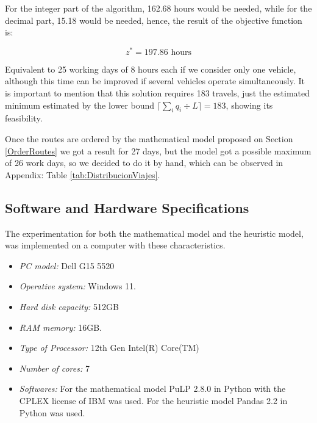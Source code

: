 \documentclass{amsart}
\begin{document}
            For the integer part of the algorithm, 162.68 hours would be needed, while for the decimal part, 15.18 would be needed, hence, the result of the objective function is:
            
            $$z^* = 197.86 \text{ hours}$$

            Equivalent to 25 working days of 8 hours each if we consider only one vehicle, although this time can be improved if several vehicles operate simultaneously. It is important to mention that this solution requires 183 travels, just the estimated minimum estimated by the lower bound $\lceil \sum_{i} q_i \div L \rceil = 183$, showing its feasibility.
            
            Once the routes are ordered by the mathematical model proposed on Section \ref{OrderRoutes} we got a result for 27 days, but the model got a possible maximum of 26 work days, so we decided to do it by hand, which can be observed in Appendix: Table \ref{tab:DistribucionViajes}.
       
            \subsection{Software and Hardware Specifications}
            
            The experimentation for both the mathematical model and the heuristic model, was implemented on a computer with these characteristics.
    
            \begin{itemize}
                \item \textit{PC model:} Dell G15 5520
                \item \textit{Operative system:} Windows 11.
                \item \textit{Hard disk capacity:} 512GB
                \item \textit{RAM memory:} 16GB.
                \item \textit{Type of Processor:} 12th Gen Intel(R) Core(TM)
                \item \textit{Number of cores:} 7
                \item \textit{Softwares:} For the mathematical model PuLP 2.8.0 in Python with the CPLEX license of IBM was used. For the heuristic model Pandas 2.2 in Python was used.
            \end{itemize}



    
    
\end{document}

